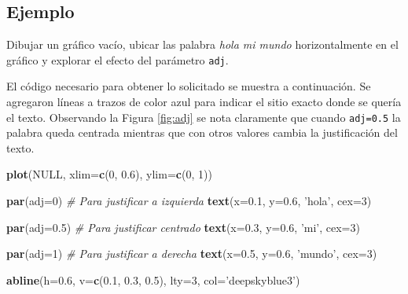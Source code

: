 \documentclass[10pt,]{krantz}
\makeatletter
\newenvironment{Shaded}{\begin{snugshade}}{\end{snugshade}}
\newcommand{\KeywordTok}[1]{\textcolor[rgb]{0.13,0.29,0.53}{\textbf{{#1}}}}
\newcommand{\DataTypeTok}[1]{\textcolor[rgb]{0.13,0.29,0.53}{{#1}}}
\newcommand{\DecValTok}[1]{\textcolor[rgb]{0.00,0.00,0.81}{{#1}}}
\newcommand{\FloatTok}[1]{\textcolor[rgb]{0.00,0.00,0.81}{{#1}}}
\newcommand{\StringTok}[1]{\textcolor[rgb]{0.31,0.60,0.02}{{#1}}}
\newcommand{\CommentTok}[1]{\textcolor[rgb]{0.56,0.35,0.01}{\textit{{#1}}}}
\newcommand{\OtherTok}[1]{\textcolor[rgb]{0.56,0.35,0.01}{{#1}}}
\newcommand{\NormalTok}[1]{{#1}}
\newenvironment{kframe}{%
\medskip{}
\setlength{\fboxsep}{.8em}
 \def\at@end@of@kframe{}%
 \ifinner\ifhmode%
  \def\at@end@of@kframe{\end{minipage}}%
  \begin{minipage}{\columnwidth}%
 \fi\fi%
 \def\FrameCommand##1{\hskip\@totalleftmargin \hskip-\fboxsep
 \colorbox{shadecolor}{##1}\hskip-\fboxsep
     \hskip-\linewidth \hskip-\@totalleftmargin \hskip\columnwidth}%
 \MakeFramed {\advance\hsize-\width
   \@totalleftmargin\z@ \linewidth\hsize
   \@setminipage}}%
 {\par\unskip\endMakeFramed%
 \at@end@of@kframe}
\renewenvironment{Shaded}{\begin{kframe}}{\end{kframe}}
\makeatother
\begin{document}
\subsection*{Ejemplo}\label{ejemplo-21}


Dibujar un gráfico vacío, ubicar las palabra \emph{hola mi mundo}
horizontalmente en el gráfico y explorar el efecto del parámetro
\texttt{adj}.

El código necesario para obtener lo solicitado se muestra a
continuación. Se agregaron líneas a trazos de color azul para indicar el
sitio exacto donde se quería el texto. Observando la Figura
\ref{fig:adj} se nota claramente que cuando \texttt{adj=0.5} la palabra
queda centrada mientras que con otros valores cambia la justificación
del texto.

\begin{Shaded}
\begin{Highlighting}[]
\KeywordTok{plot}\NormalTok{(}\OtherTok{NULL}\NormalTok{, }\DataTypeTok{xlim=}\KeywordTok{c}\NormalTok{(}\DecValTok{0}\NormalTok{, }\FloatTok{0.6}\NormalTok{), }\DataTypeTok{ylim=}\KeywordTok{c}\NormalTok{(}\DecValTok{0}\NormalTok{, }\DecValTok{1}\NormalTok{))}

\KeywordTok{par}\NormalTok{(}\DataTypeTok{adj=}\DecValTok{0}\NormalTok{)  }\CommentTok{# Para justificar a izquierda}
\KeywordTok{text}\NormalTok{(}\DataTypeTok{x=}\FloatTok{0.1}\NormalTok{, }\DataTypeTok{y=}\FloatTok{0.6}\NormalTok{, }\StringTok{'hola'}\NormalTok{, }\DataTypeTok{cex=}\DecValTok{3}\NormalTok{)}

\KeywordTok{par}\NormalTok{(}\DataTypeTok{adj=}\FloatTok{0.5}\NormalTok{)  }\CommentTok{# Para justificar centrado}
\KeywordTok{text}\NormalTok{(}\DataTypeTok{x=}\FloatTok{0.3}\NormalTok{, }\DataTypeTok{y=}\FloatTok{0.6}\NormalTok{, }\StringTok{'mi'}\NormalTok{, }\DataTypeTok{cex=}\DecValTok{3}\NormalTok{)}

\KeywordTok{par}\NormalTok{(}\DataTypeTok{adj=}\DecValTok{1}\NormalTok{)  }\CommentTok{# Para justificar a derecha}
\KeywordTok{text}\NormalTok{(}\DataTypeTok{x=}\FloatTok{0.5}\NormalTok{, }\DataTypeTok{y=}\FloatTok{0.6}\NormalTok{, }\StringTok{'mundo'}\NormalTok{, }\DataTypeTok{cex=}\DecValTok{3}\NormalTok{)}

\KeywordTok{abline}\NormalTok{(}\DataTypeTok{h=}\FloatTok{0.6}\NormalTok{, }\DataTypeTok{v=}\KeywordTok{c}\NormalTok{(}\FloatTok{0.1}\NormalTok{, }\FloatTok{0.3}\NormalTok{, }\FloatTok{0.5}\NormalTok{),}
       \DataTypeTok{lty=}\DecValTok{3}\NormalTok{, }\DataTypeTok{col=}\StringTok{'deepskyblue3'}\NormalTok{)}
\end{Highlighting}
\end{Shaded}
\end{document}
